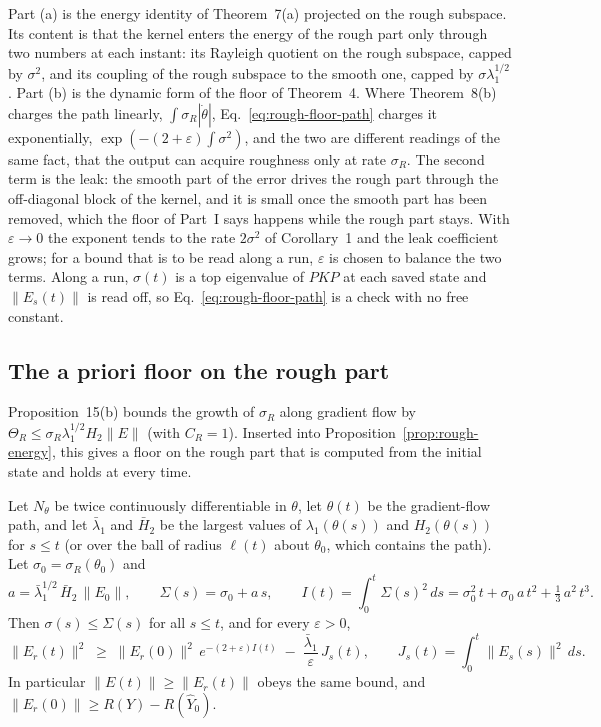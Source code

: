 Part (a) is the energy identity of Theorem~7(a) projected on the rough
subspace. Its content is that the kernel enters the energy of the rough part
only through two numbers at each instant: its Rayleigh quotient on the rough
subspace, capped by $\sigma^2$, and its coupling of the rough subspace to the
smooth one, capped by $\sigma\lambda_1^{1/2}$. Part (b) is the dynamic form of
the floor of Theorem~4. Where Theorem~8(b) charges the path linearly,
$\int\sigma_R|\dot\theta|$, Eq.~\eqref{eq:rough-floor-path} charges it
exponentially, $\exp(-(2+\varepsilon)\int\sigma^2)$, and the two are different
readings of the same fact, that the output can acquire roughness only at rate
$\sigma_R$. The second term is the leak: the smooth part of the error drives
the rough part through the off-diagonal block of the kernel, and it is small
once the smooth part has been removed, which the floor of Part~I says happens
while the rough part stays. With $\varepsilon\to0$ the exponent tends to the
rate $2\sigma^2$ of Corollary~1 and the leak coefficient grows; for a bound
that is to be read along a run, $\varepsilon$ is chosen to balance the two
terms. Along a run, $\sigma(t)$ is a top eigenvalue of $PKP$ at each saved
state and $\|E_s(t)\|$ is read off, so Eq.~\eqref{eq:rough-floor-path} is a
check with no free constant.

\subsection{The a priori floor on the rough part}

Proposition~15(b) bounds the growth of $\sigma_R$ along gradient flow by
$\Theta_R\le \sigma_R\lambda_1^{1/2}H_2\|E\|$ (with $C_R=1$). Inserted into
Proposition~\ref{prop:rough-energy}, this gives a floor on the rough part that
is computed from the initial state and holds at every time.

\begin{theorem}
\label{thm:rough-apriori}
Let $N_\theta$ be twice continuously differentiable in $\theta$, let
$\theta(t)$ be the gradient-flow path, and let $\bar\lambda_1$ and $\bar H_2$
be the largest values of $\lambda_1(\theta(s))$ and $H_2(\theta(s))$ for
$s\le t$ (or over the ball of radius $\ell(t)$ about $\theta_0$, which
contains the path). Let $\sigma_0=\sigma_R(\theta_0)$ and
\begin{equation}
a = \bar\lambda_1^{1/2}\,\bar H_2\,\|E_0\|, \qquad
\Sigma(s) = \sigma_0 + a\,s, \qquad
I(t) = \int_0^t \Sigma(s)^2\,ds = \sigma_0^2\,t + \sigma_0\,a\,t^2 + \tfrac13\,a^2\,t^3 .
\label{eq:Sigma-I}
\end{equation}
Then $\sigma(s)\le\Sigma(s)$ for all $s\le t$, and for every $\varepsilon>0$,
\begin{equation}
\|E_r(t)\|^2 \;\ge\; \|E_r(0)\|^2\, e^{-(2+\varepsilon)I(t)} \;-\; \frac{\bar\lambda_1}{\varepsilon}\, J_s(t),
\qquad
J_s(t) = \int_0^t \|E_s(s)\|^2\,ds .
\label{eq:rough-floor-apriori}
\end{equation}
In particular $\|E(t)\|\ge\|E_r(t)\|$ obeys the same bound, and
$\|E_r(0)\|\ge R(Y)-R(\hat Y_0)$.
\end{theorem}

